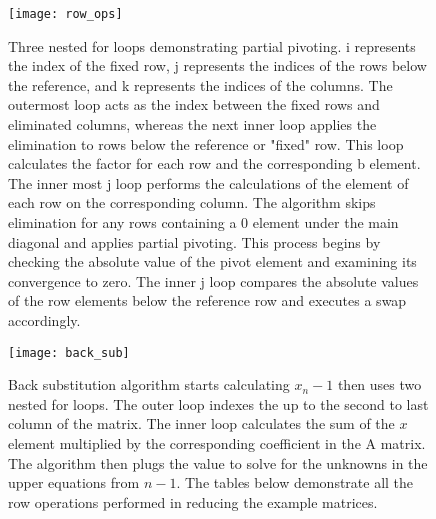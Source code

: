 \documentclass{article}
\begin{document}
    \begin{figure}[h]
    \centering
    \texttt{[image: row\_ops]}
    \caption{Three nested for loops demonstrating partial pivoting. i represents the index of the fixed row, j represents the indices of the rows below the reference, and k represents the indices of the columns. The outermost loop acts as the index between the fixed rows and eliminated columns, whereas the next inner loop applies the elimination to rows below the reference or "fixed" row. This loop calculates the factor for each row and the corresponding b element. The inner most j loop performs the calculations of the element of each row on the corresponding column. The algorithm skips elimination for any rows containing a 0 element under the main diagonal and applies partial pivoting. This process begins by checking the absolute value of the pivot element and examining its convergence to zero. The inner j loop compares the absolute values of the row elements below the reference row and executes a swap accordingly. 
   }
    \end{figure}
    
        \begin{figure}[t]
    \centering
    \texttt{[image: back\_sub]}
    \caption{Back substitution algorithm starts calculating $x_n-1$ then uses two nested for loops. The outer loop indexes the up to the second to last column of the matrix. The inner loop calculates the sum of the $x$ element multiplied by the corresponding coefficient in the A matrix. The algorithm then plugs the value to solve for the unknowns in the upper equations from $n - 1$. The tables below demonstrate all the row operations performed in reducing the example matrices.}
    \end{figure}
     
\end{document}
